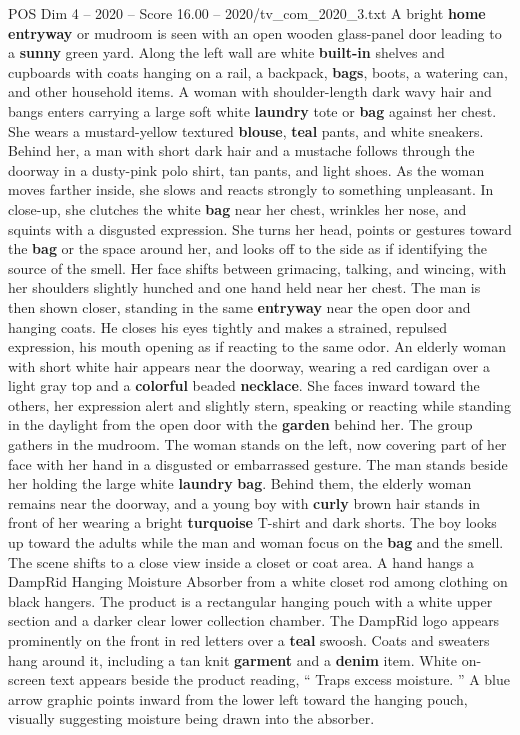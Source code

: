 \begin{textsample}{POS Dim 4 – 2020 – Score 16.00 – 2020/tv\_com\_2020\_3.txt}  \label{ex:f4_pos_014}
A bright \textbf{home} \textbf{entryway} or mudroom is seen with an open wooden glass-panel door leading to a \textbf{sunny} green yard.
Along the left wall are white \textbf{built-in} shelves and cupboards with coats hanging on a rail, a backpack, \textbf{bags}, boots, a watering can, and other household items.
A woman with shoulder-length dark wavy hair and bangs enters carrying a large soft white \textbf{laundry} tote or \textbf{bag} against her chest.
She wears a mustard-yellow textured \textbf{blouse}, \textbf{teal} pants, and white sneakers.
Behind her, a man with short dark hair and a mustache follows through the doorway in a dusty-pink polo shirt, tan pants, and light shoes.
As the woman moves farther inside, she slows and reacts strongly to something unpleasant.
In close-up, she clutches the white \textbf{bag} near her chest, wrinkles her nose, and squints with a disgusted expression.
She turns her head, points or gestures toward the \textbf{bag} or the space around her, and looks off to the side as if identifying the source of the smell.
Her face shifts between grimacing, talking, and wincing, with her shoulders slightly hunched and one hand held near her chest.
The man is then shown closer, standing in the same \textbf{entryway} near the open door and hanging coats.
He closes his eyes tightly and makes a strained, repulsed expression, his mouth opening as if reacting to the same odor.
An elderly woman with short white hair appears near the doorway, wearing a red cardigan over a light gray top and a \textbf{colorful} beaded \textbf{necklace}.
She faces inward toward the others, her expression alert and slightly stern, speaking or reacting while standing in the daylight from the open door with the \textbf{garden} behind her.
The group gathers in the mudroom.
The woman stands on the left, now covering part of her face with her hand in a disgusted or embarrassed gesture.
The man stands beside her holding the large white \textbf{laundry} \textbf{bag}.
Behind them, the elderly woman remains near the doorway, and a young boy with \textbf{curly} brown hair stands in front of her wearing a bright \textbf{turquoise} T-shirt and dark shorts.
The boy looks up toward the adults while the man and woman focus on the \textbf{bag} and the smell.
The scene shifts to a close view inside a closet or coat area.
A hand hangs a DampRid Hanging Moisture Absorber from a white closet rod among clothing on black hangers.
The product is a rectangular hanging pouch with a white upper section and a darker clear lower collection chamber.
The DampRid logo appears prominently on the front in red letters over a \textbf{teal} swoosh.
Coats and sweaters hang around it, including a tan knit \textbf{garment} and a \textbf{denim} item.
White on-screen text appears beside the product reading, “ Traps excess moisture. ” A blue arrow graphic points inward from the lower left toward the hanging pouch, visually suggesting moisture being drawn into the absorber.

\end{textsample}
